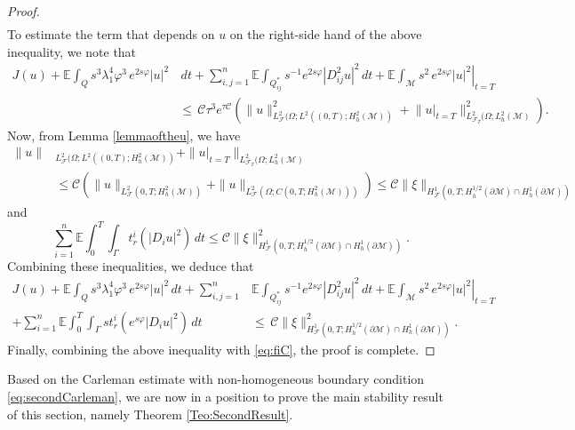 \documentclass[11pt,oneside,leqno]{amsart}
\numberwithin{equation}{section}
\numberwithin{equation}{section}
\newcommand{\E}{\mathbb{E}}
\begin{document}
\begin{proof}
\begin{equation}
\begin{split}
\end{split}
\end{equation}
To estimate the term that depends on $u$ on the right-side hand of the above inequality, we note that
\begin{equation*}
\begin{split}    J(u)+\E\int_{Q}s^{3}\lambda^{4}_{1}\varphi^{3}\,e^{2s\varphi}|u|^{2}&\,dt+\sum_{i,j=1}^{n}\E\int_{Q_{ij}^\ast}s^{-1}e^{2s\varphi}|D_{ij}^2u|^2\, dt+\left.\E\int_{\mathcal{M}}s^2\,e^{2s\varphi}|u|^2\right|_{t=T}\\
&\leq\, \mathcal{C}\tau^3e^{\tau\mathcal{C}}\left(\|u\|^2_{L^2_{\mathcal{F}}(\Omega;L^2((0,T);H_h^2(\mathcal{M}))}+\left.\|u\right|_{t=T}\|^2_{L^2_{\mathcal{F}_T}(\Omega;L_h^2(\mathcal{M})}\right).
\end{split}
\end{equation*}
Now, from Lemma \ref{lemmaoftheu}, we have
\[
\begin{aligned}
    \|u\|&_{L^2_{\mathcal{F}}(\Omega;L^2((0,T);H_h^2(\mathcal{M}))}+\|\left.u\right|_{t=T}\|_{L^2_{\mathcal{F}_T}(\Omega;L_h^2(\mathcal{M})}&\\
    &\leq \mathcal{C}\left(\|u\|_{L^2_{\mathcal{F}}(0,T;H^2_{h}(\mathcal{M}))}+\|u\|_{L^2_{\mathcal{F}}(\Omega;C(0,T;H^2_{h}(\mathcal{M})))}\right)\le \mathcal{C}\|\xi\|_{H_{\mathcal{F}}^{1}(0,T;H_{h}^{1/2}(\partial \mathcal{M})\cap H_{h}^1(\partial \mathcal{M}))}
\end{aligned}
\]
and
\[
\sum_{i=1}^{n}\E\int_{0}^{T}\int_{\Gamma}t_{r}^{i}(|D_iu|^2)\,dt\leq \mathcal{C}\|\xi\|^2_{H_{\mathcal{F}}^{1}(0,T;H_{h}^{1/2}(\partial\mathcal{M})\cap H_{h}^1(\partial\mathcal{M}))}.
\]
Combining these inequalities, we deduce that
\[
\begin{aligned}
    J(u)+\E\int_{Q}s^{3}\lambda^{4}_{1}\varphi^{3}\,e^{2s\varphi}|u|^{2}\,dt+\sum_{i,j=1}^{n}&\E\int_{Q_{ij}^\ast}s^{-1}e^{2s\varphi}|D_{ij}^2u|^2\, dt+\left.\E\int_{\mathcal{M}}s^2\,e^{2s\varphi}|u|^2\right|_{t=T}\\
+\sum_{i=1}^{n}\E\int_{0}^{T}\int_{\Gamma}st_{r}^{i}(e^{s\varphi}|D_iu|^2)\,dt&\leq\, \mathcal{C}\|\xi\|^2_{H_{\mathcal{F}}^{1}(0,T;H_{h}^{1/2}(\partial\mathcal{M})\cap H_{h}^1(\partial\mathcal{M}))}.
\end{aligned}
\]
Finally, combining the above inequality with \eqref{eq:fiC}, the proof is complete.
\end{proof}
Based on the Carleman estimate with non-homogeneous boundary condition \eqref{eq:secondCarleman}, we are now in a position to prove the main stability result of this section, namely Theorem \ref{Teo:SecondResult}.
\end{document}
